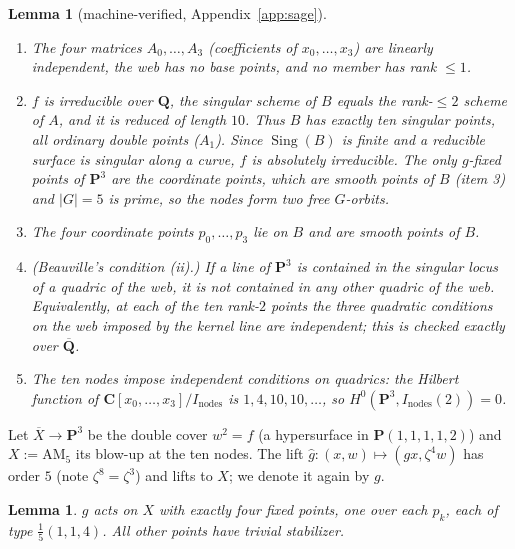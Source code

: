 \documentclass[11pt]{amsart}
\numberwithin{equation}{section}
\newtheorem{lemma}[theorem]{Lemma}
\theoremstyle{definition}
\theoremstyle{remark}
\newcommand{\Q}{\mathbf Q}
\newcommand{\C}{\mathbf C}
\newcommand{\PP}{\mathbf P}
\begin{document}
\begin{lemma}[machine-verified, Appendix~\ref{app:sage}]\label{lem:webfacts}
\begin{enumerate}
\item The four matrices $A_0,\dots,A_3$ (coefficients of $x_0,\dots,x_3$)
  are linearly independent, the web has no base points, and no member has
  rank $\le1$.
\item $f$ is irreducible over $\Q$, the singular scheme of $B$ equals the
  rank-$\le2$ scheme of $A$, and it is reduced of length $10$. Thus $B$ has
  exactly ten singular points, all ordinary double points ($A_1$). Since
  $\operatorname{Sing}(B)$ is finite and a reducible surface is singular
  along a curve, $f$ is absolutely irreducible. The only $g$-fixed points
  of $\PP^3$ are the coordinate points, which are smooth points of $B$
  (item 3) and $|G|=5$ is prime, so the nodes form two free $G$-orbits.
\item The four coordinate points $p_0,\dots,p_3$ lie on $B$ and are smooth
  points of $B$.
\item (Beauville's condition (ii).) If a line of $\PP^3$ is contained in
  the singular locus of a quadric of the web, it is not contained in any
  other quadric of the web. Equivalently, at each of the ten rank-$2$
  points the three quadratic conditions on the web imposed by the kernel
  line are independent; this is checked exactly over $\overline{\Q}$.
\item The ten nodes impose independent conditions on quadrics: the
  Hilbert function of $\C[x_0,\dots,x_3]/I_{\mathrm{nodes}}$ is
  $1,4,10,10,\dots$, so $H^0(\PP^3,I_{\mathrm{nodes}}(2))=0$.
\end{enumerate}
\end{lemma}

Let $\overline X\to\PP^3$ be the double cover $w^2=f$ (a hypersurface in
$\PP(1,1,1,1,2)$) and $X:=\mathrm{AM}_5$ its blow-up at the ten nodes. The
lift $\hat g\colon(x,w)\mapsto(gx,\zeta^4w)$ has order $5$ (note
$\zeta^8=\zeta^3$) and lifts to $X$; we denote it again by $g$.

\begin{lemma}\label{lem:fixedpts}
$g$ acts on $X$ with exactly four fixed points, one over each $p_k$, each
of type $\frac15(1,1,4)$. All other points have trivial stabilizer.
\end{lemma}
\end{document}
